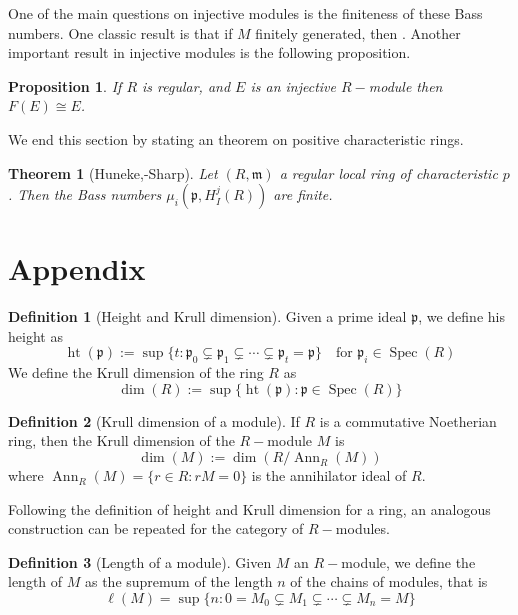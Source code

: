 \documentclass[leqno]{article}
\newtheorem{theorem}{Theorem}[section]
\newtheorem{proposition}{Proposition}[section]
\theoremstyle{definition}
\newtheorem{definition}{Definition}[section]
\DeclareMathOperator{\heigth}{ht}
\DeclareMathOperator{\Spec}{Spec}
\DeclareMathOperator{\Ann}{Ann}
\begin{document}
One of the main questions on injective modules is the finiteness of these Bass numbers. One classic result is that if $M$ finitely generated, then . Another important result in injective modules is the following proposition.

 \begin{proposition} If $R$ is regular, and $E$ is an injective $R-$module then $F(E)\cong E$.
\end{proposition}

We end this section by stating an theorem on positive characteristic rings.

\begin{theorem}[Huneke,-Sharp] Let $(R, \mathfrak{m})$ a regular local ring of characteristic $p$. Then the Bass numbers $\mu_{i}(\mathfrak{p}, H_I^j(R))$ are finite.
\end{theorem}






\section{Appendix}

\begin{definition}[Height and Krull dimension] Given a prime ideal $\mathfrak{p}$, we define his height as
  \[
	\heigth (\mathfrak{p}) := \sup \{t: \mathfrak{p}_0 \subsetneq \mathfrak{p}_1 \subsetneq \cdots \subsetneq  \mathfrak{p}_t = \mathfrak{p} \} \quad \text{for } \mathfrak{p}_i\in \Spec(R)
  \]
We define the Krull dimension of the ring $R$ as
 \[
 \dim (R) :=  \sup \{\heigth (\mathfrak{p}) : \mathfrak{p}\in \Spec(R)\}
\] 
\end{definition}

\begin{definition}[Krull dimension of a module] If  $R$ is a commutative Noetherian ring, then the Krull dimension of the  $R-$module  $M$ is
   \[
\dim(M) := \dim (R / \Ann _R(M))
  \] 
  where $\Ann_R(M) = \{r \in R : rM = 0\}$ is the annihilator ideal of $R$.
\end{definition}

Following the definition of height and Krull dimension for a ring, an analogous construction can be repeated for the category of $R-$modules.

\begin{definition}[Length of a module] Given $M$ an $R-$module, we define the length of  $M$ as the supremum of the length $n$ of the chains of modules, that is
  \[
	\ell(M)= \sup \{n: 0 = M_0\subsetneq M_1 \subsetneq \cdots \subsetneq M_n = M\}
  \] 
\end{definition}
\end{document}
